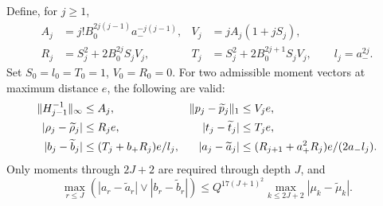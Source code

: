 \begin{lemma}
\label{prop:effective-gram-reconstruction}
Define, for \(j\ge1\),
\begin{align*}
 A_j&=j!B_0^{2j(j-1)}a_-^{-j(j-1)},&
 V_j&=jA_j(1+jS_j),\\
 R_j&=S_j^2+2B_0^{2j}S_jV_j,&
 T_j&=S_j^2+2B_0^{2j+1}S_jV_j,\qquad l_j=a_-^{2j}.
\end{align*}
Set \(S_0=l_0=T_0=1\), \(V_0=R_0=0\). For two admissible moment
vectors at maximum distance \(e\), the following are valid:
\begin{align}
 \|H_{j-1}^{-1}\|_\infty&\le A_j,&
 \|p_j-\widetilde p_j\|_1&\le V_je,\notag\\
 |\rho_j-\widetilde\rho_j|&\le R_je,&
 |t_j-\widetilde t_j|&\le T_je,\notag\\
 |b_j-\widetilde b_j|&\le (T_j+b_+R_j)e/l_j,&
 |a_j-\widetilde a_j|&\le
 (R_{j+1}+a_+^2R_j)e/(2a_-l_j).
 \label{eq:finite-map-ledger}
\end{align}
Only moments through \(2J+2\) are required through depth \(J\), and
\begin{equation}
 \max_{r\le J}(|a_r-\widetilde a_r|\vee|b_r-\widetilde b_r|)
 \le Q^{17(J+1)^2}\max_{k\le2J+2}|\mu_k-\widetilde\mu_k|.
 \label{eq:effective-gram-lipschitz}
\end{equation}
\end{lemma}
